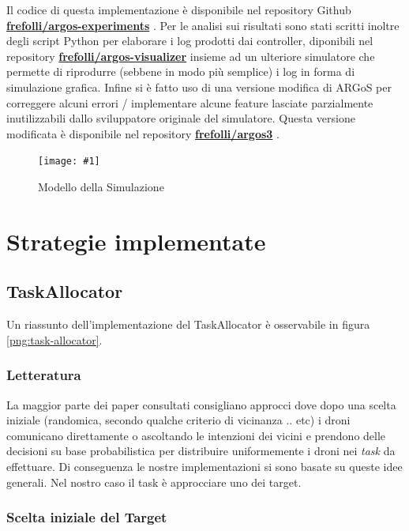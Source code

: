 \documentclass[a4paper,11pt,oneside, table]{article}
\newcommand{\putimage}[4] {
	\begin{figure}[H]
	    \centering
	    \texttt{[image: \#1]}
	    \caption{#2}\label{#3}
	\end{figure}
}
\begin{document}
Il codice di questa implementazione \`e disponibile nel repository Github \textbf{\href{http://github.com/frefolli/argos-experiments}{frefolli/argos-experiments}} \cite{RF:AE}.
Per le analisi sui risultati sono stati scritti inoltre degli script Python per elaborare i log prodotti dai controller, diponibili nel repository \textbf{\href{http://github.com/frefolli/argos-visualizer}{frefolli/argos-visualizer}} \cite{RF:AV} insieme ad un ulteriore simulatore che permette di riprodurre (sebbene in modo pi\`u semplice) i log in forma di simulazione grafica.
Infine si \`e fatto uso di una versione modifica di ARGoS per correggere alcuni errori / implementare alcune feature lasciate parzialmente inutilizzabili dallo sviluppatore originale del simulatore. Questa versione modificata \`e disponibile nel repository \textbf{\href{http://github.com/frefolli/argos3}{frefolli/argos3}} \cite{RF:A3}.

\putimage{images/simulation-model.png}{Modello della Simulazione}{png:simulation-model}{0.99}

\section{Strategie implementate}

\subsection{TaskAllocator}

Un riassunto dell'implementazione del TaskAllocator \`e osservabile in figura \ref{png:task-allocator}.

\subsubsection{Letteratura}

La maggior parte dei paper consultati consigliano approcci dove dopo una scelta iniziale (randomica, secondo qualche criterio di vicinanza .. etc) i droni comunicano direttamente o ascoltando le intenzioni dei vicini e prendono delle decisioni su base probabilistica per distribuire uniformemente i droni nei \textit{task} da effettuare.
Di conseguenza le nostre implementazioni si sono basate su queste idee generali. Nel nostro caso il task \`e approcciare uno dei target.

\subsubsection{Scelta iniziale del Target}
\end{document}
